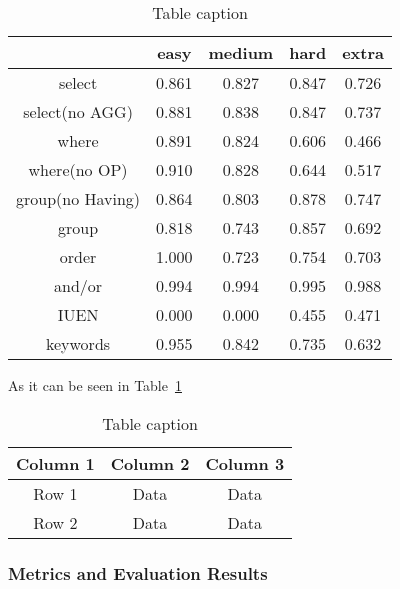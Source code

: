 \begin{table}[h]
    \centering
    \begin{tabular}{|c|c|c|c|c|}
        \hline
                         & easy  & medium & hard  & extra \\ \hline
        select           & 0.861 & 0.827  & 0.847 & 0.726 \\ \hline
        select(no AGG)   & 0.881 & 0.838  & 0.847 & 0.737 \\ \hline
        where            & 0.891 & 0.824  & 0.606 & 0.466 \\ \hline
        where(no OP)     & 0.910 & 0.828  & 0.644 & 0.517 \\ \hline
        group(no Having) & 0.864 & 0.803  & 0.878 & 0.747 \\ \hline
        group            & 0.818 & 0.743  & 0.857 & 0.692 \\ \hline
        order            & 1.000 & 0.723  & 0.754 & 0.703 \\ \hline
        and/or           & 0.994 & 0.994  & 0.995 & 0.988 \\ \hline
        IUEN             & 0.000 & 0.000  & 0.455 & 0.471 \\ \hline
        keywords         & 0.955 & 0.842  & 0.735 & 0.632 \\ \hline
    \end{tabular}
    \caption{Table caption}
    \label{tab:my_table}
\end{table}

As it can be seen in Table~\ref{tab:my_table}

\begin{table}[h]
    \centering
    \begin{tabular}{|c|c|c|}
        \hline
        Column 1 & Column 2 & Column 3 \\
        \hline
        Row 1    & Data     & Data     \\
        \hline
        Row 2    & Data     & Data     \\
        \hline
    \end{tabular}
    \caption{Table caption}
\end{table}

\subsubsection{Metrics and Evaluation Results}